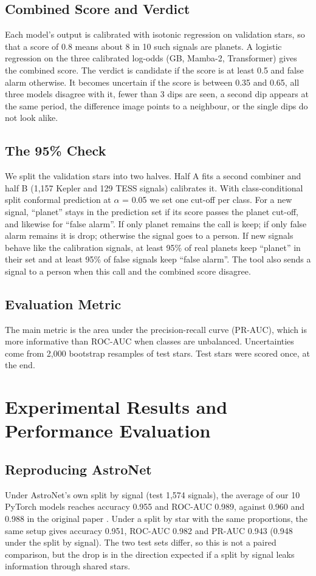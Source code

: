 \documentclass[conference,a4paper]{IEEEtran}
\begin{document}
\subsection{Combined Score and Verdict}
Each model's output is calibrated with isotonic regression on validation stars, so that a score of 0.8 means about 8 in 10 such signals are planets. A logistic regression on the three calibrated log-odds (GB, Mamba-2, Transformer) gives the combined score. The verdict is candidate if the score is at least 0.5 and false alarm otherwise. It becomes uncertain if the score is between 0.35 and 0.65, all three models disagree with it, fewer than 3 dips are seen, a second dip appears at the same period, the difference image points to a neighbour, or the single dips do not look alike.

\subsection{The 95\% Check}
We split the validation stars into two halves. Half A fits a second combiner and half B (1,157 Kepler and 129 TESS signals) calibrates it. With class-conditional split conformal prediction at $\alpha$ = 0.05 we set one cut-off per class. For a new signal, ``planet'' stays in the prediction set if its score passes the planet cut-off, and likewise for ``false alarm''. If only planet remains the call is keep; if only false alarm remains it is drop; otherwise the signal goes to a person. If new signals behave like the calibration signals, at least 95\% of real planets keep ``planet'' in their set and at least 95\% of false signals keep ``false alarm''. The tool also sends a signal to a person when this call and the combined score disagree.

\subsection{Evaluation Metric}
The main metric is the area under the precision-recall curve (PR-AUC), which is more informative than ROC-AUC when classes are unbalanced. Uncertainties come from 2,000 bootstrap resamples of test stars. Test stars were scored once, at the end.

\section{Experimental Results and Performance Evaluation}
\subsection{Reproducing AstroNet}
Under AstroNet's own split by signal (test 1,574 signals), the average of our 10 PyTorch models reaches accuracy 0.955 and ROC-AUC 0.989, against 0.960 and 0.988 in the original paper \cite{r3}. Under a split by star with the same proportions, the same setup gives accuracy 0.951, ROC-AUC 0.982 and PR-AUC 0.943 (0.948 under the split by signal). The two test sets differ, so this is not a paired comparison, but the drop is in the direction expected if a split by signal leaks information through shared stars.
\end{document}
